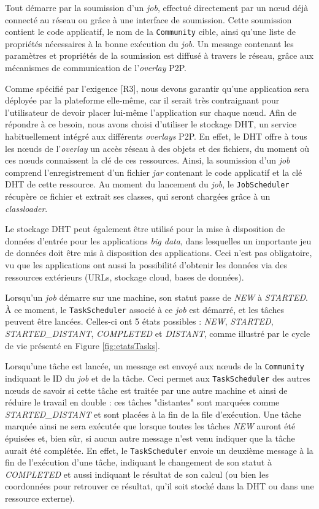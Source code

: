 Tout démarre par la soumission d'un \textit{job}, effectué directement par un n{\oe}ud déjà connecté au réseau ou grâce à une interface de soumission. Cette soumission contient le code applicatif, le nom de la \texttt{Community} cible, ainsi qu'une liste de propriétés nécessaires à la bonne exécution du \textit{job}. Un message contenant les paramètres et propriétés de la soumission est diffusé à travers le réseau, grâce aux mécanismes de communication de l'\textit{overlay} P2P.

Comme spécifié par l'exigence [R3], nous devons garantir qu'une application sera déployée par la plateforme elle-même, car il serait très contraignant pour l'utilisateur de devoir placer lui-même l'application sur chaque n{\oe}ud. Afin de répondre à ce besoin, nous avons choisi d'utiliser le stockage DHT, un service habituellement intégré aux différents \textit{overlays} P2P. En effet, le DHT offre à tous les n{\oe}uds de l'\textit{overlay} un accès réseau à des objets et des fichiers, du moment où ces n{\oe}uds connaissent la clé de ces ressources. Ainsi, la soumission d'un \textit{job} comprend l'enregistrement d'un fichier \textit{jar} contenant le code applicatif et la clé DHT de cette ressource. Au moment du lancement du \textit{job}, le \texttt{JobScheduler} récupère ce fichier et extrait ses classes, qui seront chargées grâce à un \textit{classloader}. 

Le stockage DHT peut également être utilisé pour la mise à disposition de données d'entrée pour les applications \textit{big data}, dans lesquelles un importante jeu de données doit être mis à disposition des applications. Ceci n'est pas obligatoire, vu que les applications ont aussi la possibilité d'obtenir les données via des ressources extérieurs (URLs, stockage cloud, bases de données).

Lorsqu'un \textit{job} démarre sur une machine, son statut passe de \textit{NEW} à \textit{STARTED}. À ce moment, le \texttt{TaskScheduler} associé à ce \textit{job} est démarré, et les tâches peuvent être lancées. Celles-ci ont 5 états possibles : \textit{NEW}, \textit{STARTED}, \textit{STARTED\_DISTANT}, \textit{COMPLETED} et \textit{DISTANT}, comme illustré par le cycle de vie présenté en Figure \ref{fig:etatsTasks}.


Lorsqu'une tâche est lancée, un message est envoyé aux n{\oe}uds de la \texttt{Community} indiquant le ID du \textit{job} et de la tâche. Ceci permet aux \texttt{TaskScheduler} des autres n{\oe}uds de savoir si cette tâche est traitée par une autre machine et ainsi de réduire le travail en double : ces tâches "distantes" sont marquées comme \textit{STARTED\_DISTANT} et sont placées à la fin de la file d'exécution. Une tâche marquée ainsi ne sera exécutée que lorsque toutes les tâches \textit{NEW} auront été épuisées et, bien sûr, si aucun autre message n'est venu indiquer que la tâche aurait été complétée. En effet, le \texttt{TaskScheduler} envoie un deuxième message à la fin de l'exécution d'une tâche, indiquant le changement de son statut à \textit{COMPLETED} et aussi indiquant le résultat de son calcul (ou bien les coordonnées pour retrouver ce résultat, qu'il soit stocké dans la DHT ou dans une ressource externe).

